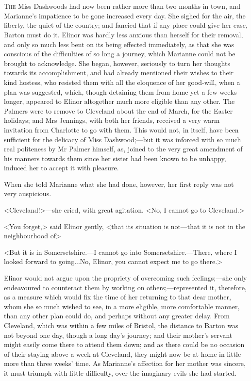 \chapter[Chapter \thechapter]{}
\lettrine[lraise=0.3]{T}{he} Miss Dashwoods had now been rather more than two months in town, and Marianne's impatience to be gone increased every day. She sighed for the air, the liberty, the quiet of the country; and fancied that if any place could give her ease, Barton must do it. Elinor was hardly less anxious than herself for their removal, and only so much less bent on its being effected immediately, as that she was conscious of the difficulties of so long a journey, which Marianne could not be brought to acknowledge. She began, however, seriously to turn her thoughts towards its accomplishment, and had already mentioned their wishes to their kind hostess, who resisted them with all the eloquence of her good-will, when a plan was suggested, which, though detaining them from home yet a few weeks longer, appeared to Elinor altogether much more eligible than any other. The Palmers were to remove to Cleveland about the end of March, for the Easter holidays; and Mrs Jennings, with both her friends, received a very warm invitation from Charlotte to go with them. This would not, in itself, have been sufficient for the delicacy of Miss Dashwood;—but it was inforced with so much real politeness by Mr Palmer himself, as, joined to the very great amendment of his manners towards them since her sister had been known to be unhappy, induced her to accept it with pleasure.

When she told Marianne what she had done, however, her first reply was not very auspicious.

<Cleveland!>—she cried, with great agitation. <No, I cannot go to Cleveland.>

<You forget,> said Elinor gently, <that its situation is not—that it is not in the neighbourhood of\longdash>

<But it is in Somersetshire.—I cannot go into Somersetshire.—There, where I looked forward to going...No, Elinor, you cannot expect me to go there.>

Elinor would not argue upon the propriety of overcoming such feelings;—she only endeavoured to counteract them by working on others;—represented it, therefore, as a measure which would fix the time of her returning to that dear mother, whom she so much wished to see, in a more eligible, more comfortable manner, than any other plan could do, and perhaps without any greater delay. From Cleveland, which was within a few miles of Bristol, the distance to Barton was not beyond one day, though a long day's journey; and their mother's servant might easily come there to attend them down; and as there could be no occasion of their staying above a week at Cleveland, they might now be at home in little more than three weeks' time. As Marianne's affection for her mother was sincere, it must triumph with little difficulty, over the imaginary evils she had started.

